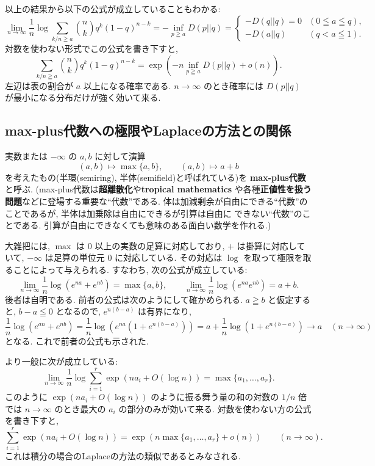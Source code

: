 \documentclass[12pt,twoside]{jarticle}
\theoremstyle{definition} %
\theoremstyle{definition} %
\theoremstyle{definition} %
\numberwithin{theorem}{section}
\numberwithin{equation}{section}
\numberwithin{figure}{section}
\numberwithin{table}{section}
\begin{document}
以上の結果から以下の公式が成立していることもわかる:
\[
\lim_{n\to\infty}
\frac{1}{n}\log\sum_{k/n\geqq a} \binom{n}{k}q^k(1-q)^{n-k}
=-\inf_{p\geqq a} D(p||q)
=
\begin{cases}
-D(q||q)=0 & (0\leqq a\leqq q), \\
-D(a||q)   & (q<a\leqq 1).
\end{cases}
\]
対数を使わない形式でこの公式を書き下すと,
\[
\sum_{k/n\geqq a} \binom{n}{k}q^k(1-q)^{n-k}
=
\exp\left(-n\inf_{p\geqq a}D(p||q) + o(n)\right).
\]
左辺は表の割合が $a$ 以上になる確率である.
$n\to\infty$ のとき確率には $D(p||q)$ が最小になる分布だけが強く効いて来る.



\subsection{max-plus代数への極限やLaplaceの方法との関係}

実数または $-\infty$ の $a,b$ に対して演算
\[
(a,b)\mapsto\max\{a,b\}, \qquad
(a,b)\mapsto a+b
\]
を考えたもの(半環(semiring), 半体(semifield)と呼ばれている)を
{\bf max-plus代数}と呼ぶ.
(max-plus代数は{\bf 超離散化}や{\bf tropical mathematics} 
や各種{\bf 正値性を扱う問題}などに登場する重要な``代数''である. 
体は加減剰余が自由にできる``代数''のことであるが, 
半体は加乗除は自由にできるが引算は自由に
できない``代数''のことである.
引算が自由にできなくても意味のある面白い数学を作れる.)

大雑把には, $\max$ は $0$ 以上の実数の足算に対応しており, 
$+$ は掛算に対応していて, $-\infty$ は足算の単位元 $0$ に対応している.
その対応は $\log$ を取って極限を取ることによって与えられる.
すなわち, 次の公式が成立している:
\[
\lim_{n\to\infty}\frac{1}{n}\log(e^{na}+e^{nb})=\max\{a,b\}, \qquad
\lim_{n\to\infty}\frac{1}{n}\log(e^{na}e^{nb})=a+b.
\]
後者は自明である.
前者の公式は次のようにして確かめられる. 
$a\geqq b$ と仮定すると, $b-a\leqq 0$ となるので, 
$e^{n(b-a)}$ は有界になり, 
\[
\frac{1}{n}\log(e^{an}+e^{nb})
=\frac{1}{n}\log\left(e^{na}\left(1+e^{n(b-a)}\right)\right)
=a+\frac{1}{n}\log\left(1+e^{n(b-a)}\right)
\to a
\quad (n\to\infty)
\]
となる. これで前者の公式も示された.

より一般に次が成立している:
\[
\lim_{n\to\infty}\frac{1}{n}\log\sum_{i=1}^r \exp(na_i+O(\log n)) 
= \max\{a_1,\ldots,a_r\}.
\]
このように $\exp(na_i+O(\log n))$ のように振る舞う量の和の対数の $1/n$ 倍では
$n\to\infty$ のとき最大の $a_i$ の部分のみが効いて来る.
対数を使わない方の公式を書き下すと, 
\[
\sum_{i=1}^r \exp(na_i+O(\log n))
=
\exp(n\max\{a_1,\ldots,a_r\}+o(n))
\qquad
(n\to\infty).
\]
これは積分の場合のLaplaceの方法の類似であるとみなされる.
\end{document}
